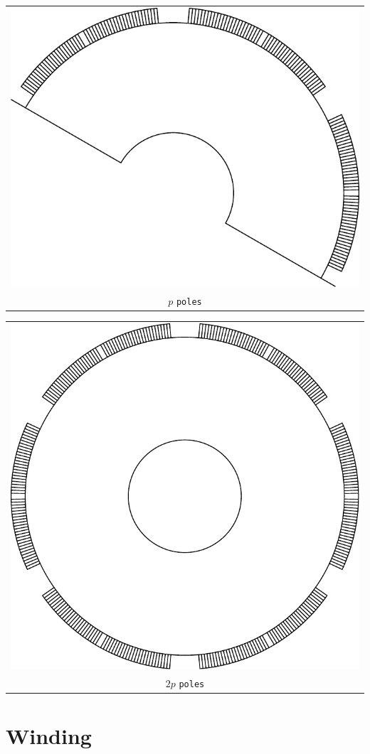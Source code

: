 \documentclass[a4paper,11pt,oneside]{report}
\begin{document}
\begin{tabular}{c}
\includegraphics[scale=0.75]{../examples/rotors/ppole} 
\\
$ p $ \texttt{poles}
\end{tabular}
\vspace{5mm}

\begin{tabular}{c}
\includegraphics[scale=0.75]{../examples/rotors/2ppole} 
\\
$ 2p $ \texttt{poles}
\end{tabular}




\chapter{Winding}
\end{document}
